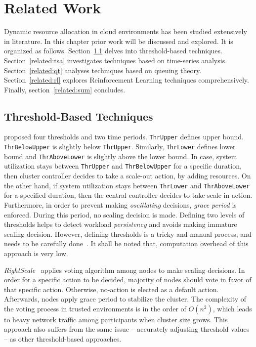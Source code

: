 \chapter{Related Work}
\label{related}
Dynamic resource allocation in cloud environments has been studied extensively in literature. In this chapter prior work will be discussed and explored. It is organized as follows. Section~\ref{related:thb} delves into threshold-based techniques. Section~\ref{related:tsa} investigates techniques based on time-series analysis. Section~\ref{related:qt} analyses techniques based on queuing theory. Section~\ref{related:rl} explores Reinforcement Learning techniques comprehensively. Finally, section~\ref{related:sum} concludes.

\section{Threshold-Based Techniques}
\label{related:thb}

\textcite{Hasan2012IntegratedAA} proposed four thresholds and two time periods. \lstinline$ThrUpper$ defines upper bound. \lstinline$ThrBelowUpper$ is slightly below \lstinline$ThrUpper$. Similarly, \lstinline$ThrLower$ defines lower bound and \lstinline$ThrAboveLower$ is slightly above the lower bound. In case, system utilization stays between \lstinline$ThrUpper$ and \lstinline$ThrBelowUpper$ for a specific duration, then cluster controller decides to take a scale-out action, by adding resources. On the other hand, if system utilization stays between \lstinline$ThrLower$ and \lstinline$ThrAboveLower$ for a specified duration, then the central controller decides to take scale-in action. Furthermore, in order to prevent making \emph{oscillating} decisions, \emph{grace period} is enforced. During this period, no scaling decision is made. Defining two levels of thresholds helps to detect workload \emph{persistency} and avoids making immature scaling decision. However, defining thresholds is a tricky and manual process, and needs to be carefully done~\cite{Dutreilh2010}. It shall be noted that, computation overhead of this approach is very low.

\emph{RightScale}~\cite{RightScale} applies voting algorithm among nodes to make scaling decisions. In order for a specific action to be decided, majority of nodes should vote in favor of that specific action. Otherwise, no-action is elected as a default action. Afterwards, nodes apply grace period to stabilize the cluster. The complexity of the voting process in trusted environments is in the order of $O(n^2)$, which leads to heavy network traffic among participants when cluster size grows. This approach also suffers from the same issue -- accurately adjusting threshold values -- as other threshold-based approaches.

